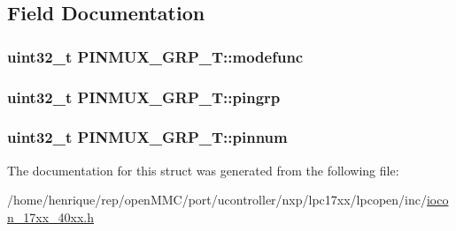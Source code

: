 \subsection{Field Documentation}
\hypertarget{structPINMUX__GRP__T_a32ddff5b2f6776cc4c3d22e14c85d75a}{
\subsubsection[{modefunc}]{\setlength{\rightskip}{0pt plus 5cm}uint32\-\_\-t P\-I\-N\-M\-U\-X\-\_\-\-G\-R\-P\-\_\-\-T\-::modefunc}}\label{structPINMUX__GRP__T_a32ddff5b2f6776cc4c3d22e14c85d75a}
\hypertarget{structPINMUX__GRP__T_a500436bd5b250eda1bac290e285d9e0d}{
\subsubsection[{pingrp}]{\setlength{\rightskip}{0pt plus 5cm}uint32\-\_\-t P\-I\-N\-M\-U\-X\-\_\-\-G\-R\-P\-\_\-\-T\-::pingrp}}\label{structPINMUX__GRP__T_a500436bd5b250eda1bac290e285d9e0d}
\hypertarget{structPINMUX__GRP__T_a7e2e3cb5f08e82cdad3ff8b215d0d448}{
\subsubsection[{pinnum}]{\setlength{\rightskip}{0pt plus 5cm}uint32\-\_\-t P\-I\-N\-M\-U\-X\-\_\-\-G\-R\-P\-\_\-\-T\-::pinnum}}\label{structPINMUX__GRP__T_a7e2e3cb5f08e82cdad3ff8b215d0d448}


The documentation for this struct was generated from the following file\-:\begin{DoxyCompactItemize}
\item 
/home/henrique/rep/open\-M\-M\-C/port/ucontroller/nxp/lpc17xx/lpcopen/inc/\hyperlink{iocon__17xx__40xx_8h}{iocon\-\_\-17xx\-\_\-40xx.\-h}\end{DoxyCompactItemize}
